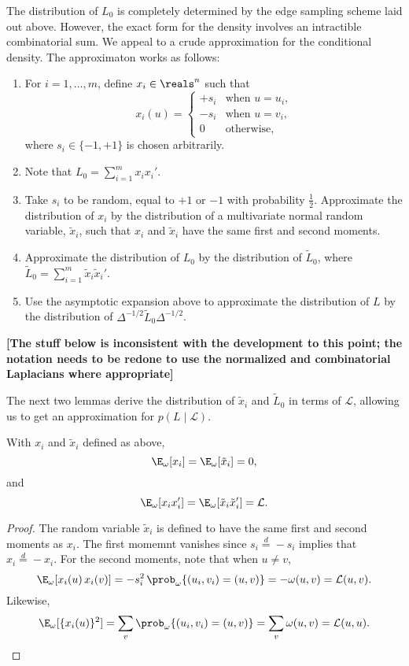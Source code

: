 The distribution of $L_0$ is completely determined by the edge
sampling scheme laid out above.  However, the exact form for the
density involves an intractible combinatorial sum.  We appeal to a
crude approximation for the conditional density.
The approximaton works as follows:
\begin{enumerate}
\item For $i = 1, \dotsc, m$, define $x_i \in \reals^n$ such that
  \[
    x_i(u)
      =
      \begin{cases}
        +s_i &\text{when $u = u_i$,} \\
        -s_i &\text{when $u = v_i$,} \\
        0 &\text{otherwise,}
      \end{cases}
  \]
  where $s_i \in \{ -1, +1 \}$ is chosen arbitrarily.
\item Note that $L_0 = \sum_{i=1}^m x_i x_i'$.
\item Take $s_i$ to be random, equal to $+1$ or $-1$ with probability
  $\tfrac{1}{2}$.  Approximate the distribution of $x_i$ by the
  distribution of a multivariate normal random variable, $\tilde x_i$,
  such that $x_i$ and $\tilde x_i$ have the same first and second
  moments.
\item Approximate the distribution of $L_0$ by the distribution of $\tilde L_0$, where
  \(
  \tilde L_0 = \sum_{i=1}^m \tilde x_i \tilde x_i'.
  \)
  \item Use the asymptotic expansion above to approximate the
    distribution of $L$ by the distribution of
    $\Delta^{-1/2} \tilde L_0 \Delta^{-1/2}$.
\end{enumerate}

\textbf{[The stuff below is inconsistent with the development to this point;
the notation needs to be redone to use the normalized and
combinatorial Laplacians where appropriate]}

\noindent
The next two lemmas derive the distribution of $\tilde x_i$ and
$\tilde L_0$ in terms of $\mathcal{L}$, allowing us to get an
approximation for $p(L \mid \mathcal{L})$.

\begin{lemma}
  With $x_i$ and $\tilde x_i$ defined as above,
  \[
    \E_\omega[ x_i ] = \E_\omega[ \tilde x_i ] = 0,
  \]
  and
  \[
    \E_\omega[ x_i x_i' ] = \E_\omega [ \tilde x_i \tilde x_i' ] = \mathcal{L}.
  \]
\end{lemma}
\begin{proof}
The random variable $\tilde x_i$ is defined to have the same first
and second moments as $x_i$.
The first momemnt vanishes since $s_i \overset{d}{=} -s_i$ implies
that $x_i \overset{d}{=} -x_i$.  For the second moments, note that
when $u \neq v$, 
\[
  \E_\omega[x_i(u) \, x_i(v)]
  = -s_i^2 \, \prob_\omega\{ (u_i,v_i) = (u,v) \}  = -\omega(u,v)
  = \mathcal{L}(u,v).
\]
Likewise,
\[
  \E_\omega[\{x_i(u)\}^2]
      = \sum_{v} \prob_\omega\{ (u_i,v_i) = (u,v) \}
      = \sum_{v} \omega(u,v)
      = \mathcal{L}(u,u).
\]
\end{proof}

